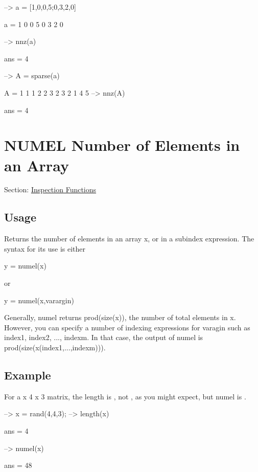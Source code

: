 \begin{DoxyVerbInclude}
--> a = [1,0,0,5;0,3,2,0]

a = 
 1 0 0 5 
 0 3 2 0 

--> nnz(a)

ans = 
 4 

--> A = sparse(a)

A = 
 1 1 1
 2 2 3
 2 3 2
 1 4 5
--> nnz(A)

ans = 
 4 
\end{DoxyVerbInclude}
 \hypertarget{inspection_numel}{}\section{N\-U\-M\-E\-L Number of Elements in an Array}\label{inspection_numel}
Section\-: \hyperlink{sec_inspection}{Inspection Functions} \hypertarget{vtkwidgets_vtkxyplotwidget_Usage}{}\subsection{Usage}\label{vtkwidgets_vtkxyplotwidget_Usage}
Returns the number of elements in an array {\ttfamily x}, or in a subindex expression. The syntax for its use is either \begin{DoxyVerb}   y = numel(x)
\end{DoxyVerb}
 or \begin{DoxyVerb}   y = numel(x,varargin)
\end{DoxyVerb}
 Generally, {\ttfamily numel} returns {\ttfamily prod(size(x))}, the number of total elements in {\ttfamily x}. However, you can specify a number of indexing expressions for {\ttfamily varagin} such as {\ttfamily index1, index2, ..., indexm}. In that case, the output of {\ttfamily numel} is {\ttfamily prod(size(x(index1,...,indexm)))}. \hypertarget{variables_struct_Example}{}\subsection{Example}\label{variables_struct_Example}
For a { x 4 x 3} matrix, the length is {}, not {}, as you might expect, but {\ttfamily numel} is {}.


\begin{DoxyVerbInclude}
--> x = rand(4,4,3);
--> length(x)

ans = 
 4 

--> numel(x)

ans = 
 48 
\end{DoxyVerbInclude}


